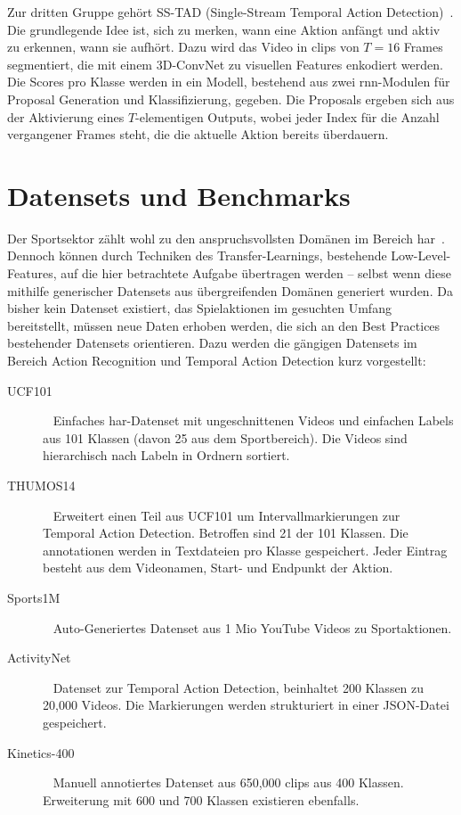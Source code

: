Zur dritten Gruppe gehört \ua SS-TAD (Single-Stream Temporal Action Detection)~\cite{Buch17}.
Die grundlegende Idee ist, sich zu merken, wann eine Aktion anfängt und aktiv zu erkennen, wann sie aufhört.
Dazu wird das Video in \glspl{clip} von $T=16$ Frames segmentiert, die mit einem 3D-ConvNet zu visuellen Features enkodiert werden.
Die Scores pro Klasse werden in ein Modell, bestehend aus zwei \gls{rnn}-Modulen für Proposal Generation und Klassifizierung, gegeben.
Die Proposals ergeben sich aus der Aktivierung eines $T$-elementigen Outputs, wobei jeder Index für die Anzahl vergangener Frames steht, die die aktuelle Aktion bereits überdauern.

\section{Datensets und Benchmarks}
\label{sec:datensets-und-benchmarks}

Der Sportsektor zählt wohl zu den anspruchsvollsten Domänen im Bereich \gls{har}~\cite{Sozykin17}.
Dennoch können durch Techniken des Transfer-Learnings, bestehende Low-Level-Features, auf die hier betrachtete Aufgabe übertragen werden -- selbst wenn diese mithilfe generischer Datensets aus übergreifenden Domänen generiert wurden.
Da bisher kein Datenset existiert, das Spielaktionen im gesuchten Umfang bereitstellt, müssen neue Daten erhoben werden, die sich an den Best Practices bestehender Datensets orientieren.
Dazu werden die gängigen Datensets im Bereich Action Recognition und Temporal Action Detection kurz vorgestellt:

\begin{description}
    \item[UCF101]~\cite{Soomro12} Einfaches \gls{har}-Datenset mit ungeschnittenen Videos und einfachen Labels aus 101 Klassen (davon 25 aus dem Sportbereich).
    Die Videos sind hierarchisch nach Labeln in Ordnern sortiert.
    \item[THUMOS14]~\cite{THUMOS14} Erweitert einen Teil aus UCF101 um Intervallmarkierungen zur Temporal Action Detection.
    Betroffen sind 21 der 101 Klassen.
    Die \gls{annotationen} werden in Textdateien pro Klasse gespeichert.
    Jeder Eintrag besteht aus dem Videonamen, Start- und Endpunkt der Aktion.
    \item[Sports1M]~\cite{Karpathy14} Auto-Generiertes Datenset aus 1 Mio YouTube Videos zu Sportaktionen.
    \item[ActivityNet]~\cite{Caba15} Datenset zur Temporal Action Detection, beinhaltet 200 Klassen zu 20,000 Videos.
    Die Markierungen werden strukturiert in einer JSON-Datei gespeichert.
    \item[Kinetics-400]~\cite{Kay17} Manuell annotiertes Datenset aus 650,000 \glspl{clip} aus 400 Klassen.
    Erweiterung mit 600 und 700 Klassen existieren ebenfalls.
\end{description}

